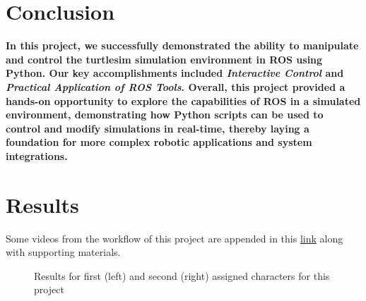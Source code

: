 \documentclass[conference]{IEEEtran}
\begin{document}
\section{Conclusion}
\textbf{In this project, we successfully demonstrated the ability to manipulate and control the turtlesim simulation environment in ROS using Python. Our key accomplishments included \textit{Interactive Control} and \textit{Practical Application of ROS Tools}. Overall, this project provided a hands-on opportunity to explore the capabilities of ROS in a simulated environment, demonstrating how Python scripts can be used to control and modify simulations in real-time, thereby laying a foundation for more complex robotic applications and system integrations.}
\vspace{10px}

\section{Results}
Some videos from the workflow of this project are appended in this \href{https://drive.google.com/drive/folders/1shN1r_mjPmyW_KCoqPHrUwNnDsbRPgS5?usp=sharing}{link} along with supporting materials.

\begin{figure}[htbp]
    \centering
    \caption{Results for first (left) and second (right) assigned characters for this project}
    \label{fig:char_results}
\end{figure}
\end{document}
